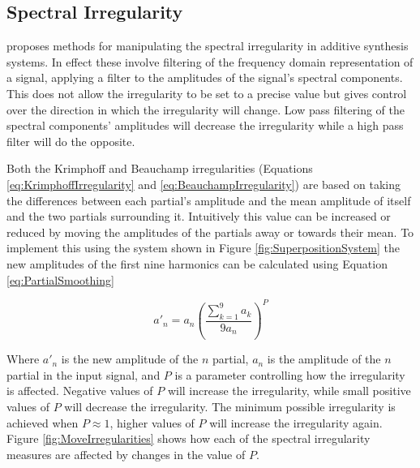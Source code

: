 	\subsection{Spectral Irregularity}
	\label{sec:FeatureControl-Parameterisation-Irregularity}
		\citet{beauchamp2007analysis} proposes methods for manipulating the spectral irregularity in additive
		synthesis systems. In effect these involve filtering of the frequency domain representation of a signal,
		applying a filter to the amplitudes of the signal's spectral components. This does not allow the
		irregularity to be set to a precise value but gives control over the direction in which the irregularity
		will change. Low pass filtering of the spectral components' amplitudes will decrease the irregularity while
		a high pass filter will do the opposite.
		
		Both the Krimphoff and Beauchamp irregularities (Equations \ref{eq:KrimphoffIrregularity} and
		\ref{eq:BeauchampIrregularity}) are based on taking the differences between each partial's amplitude and
		the mean amplitude of itself and the two partials surrounding it. Intuitively this value can be increased
		or reduced by moving the amplitudes of the partials away or towards their mean. To implement this using the
		system shown in Figure \ref{fig:SuperpositionSystem} the new amplitudes of the first nine harmonics can be
		calculated using Equation \ref{eq:PartialSmoothing}

		\begin{equation}
			a'_{n} = a_{n} \left( \frac{\sum_{k = 1}^{9} a_{k}}{9a_{n}} \right) ^{P}
			\label{eq:PartialSmoothing}
		\end{equation}

		Where $a'_{n}$ is the new amplitude of the $n$ partial, $a_{n}$ is the amplitude of the
		$n$ partial in the input signal, and $P$ is a parameter controlling how the irregularity is
		affected. Negative values of $P$ will increase the irregularity, while small positive values of $P$ will
		decrease the irregularity. The minimum possible irregularity is achieved when $P \approx 1$, higher values
		of $P$ will increase the irregularity again. Figure \ref{fig:MoveIrregularities} shows how each of the
		spectral irregularity measures are affected by changes in the value of $P$.

